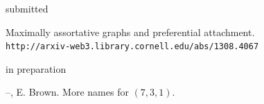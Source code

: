\documentclass[10pt,a4paper]{article}
\begin{document}
\fi

\iffalse


\vspace{.25cm}
{\sc submitted}
\begin{enumerate}[label={[\arabic*]},labelindent=1cm,nolistsep]
\setcounter{enumi}{\value{paper}}
\item
Maximally assortative graphs and preferential attachment.\\ {\tt\small\nolinkurl{http://arxiv-web3.library.cornell.edu/abs/1308.4067}}
\setcounter{paper}{\value{enumi}}
\end{enumerate}

\vspace{.25cm}
{\sc in preparation}
\begin{enumerate}[label={[\arabic*]},labelindent=1cm,nolistsep]
\setcounter{enumi}{\value{paper}}
\item
--, E. Brown. More names for \((7,3,1)\).
\setcounter{paper}{\value{enumi}}
\end{enumerate}


\end{document}
